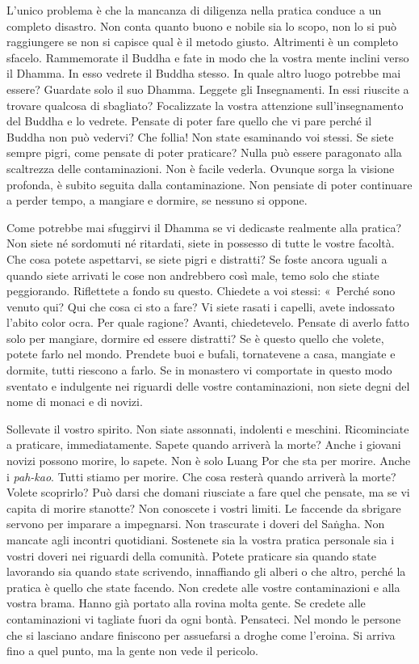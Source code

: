 L'unico problema è che la mancanza di diligenza nella pratica conduce a
un completo disastro. Non conta quanto buono e nobile sia lo scopo, non
lo si può raggiungere se non si capisce qual è il metodo giusto.
Altrimenti è un completo sfacelo. Rammemorate il Buddha e fate in modo
che la vostra mente inclini verso il Dhamma. In esso vedrete il Buddha
stesso. In quale altro luogo potrebbe mai essere? Guardate solo il suo
Dhamma. Leggete gli Insegnamenti. In essi riuscite a trovare qualcosa di
sbagliato? Focalizzate la vostra attenzione sull'insegnamento del Buddha
e lo vedrete. Pensate di poter fare quello che vi pare perché il Buddha
non può vedervi? Che follia! Non state esaminando voi stessi. Se siete
sempre pigri, come pensate di poter praticare? Nulla può essere
paragonato alla scaltrezza delle contaminazioni. Non è facile vederla.
Ovunque sorga la visione profonda, è subito seguita dalla
contaminazione. Non pensiate di poter continuare a perder tempo, a
mangiare e dormire, se nessuno si oppone.


Come potrebbe mai sfuggirvi il Dhamma se vi dedicaste realmente alla
pratica? Non siete né sordomuti né ritardati, siete in possesso di tutte
le vostre facoltà. Che cosa potete aspettarvi, se siete pigri e
distratti? Se foste ancora uguali a quando siete arrivati le cose non
andrebbero così male, temo solo che stiate peggiorando. Riflettete a
fondo su questo. Chiedete a voi stessi: «~Perché sono venuto qui? Qui
che cosa ci sto a fare? Vi siete rasati i capelli, avete indossato
l'abito color ocra. Per quale ragione? Avanti, chiedetevelo. Pensate di
averlo fatto solo per mangiare, dormire ed essere distratti? Se è questo
quello che volete, potete farlo nel mondo. Prendete buoi e bufali,
tornatevene a casa, mangiate e dormite, tutti riescono a farlo. Se in
monastero vi comportate in questo modo sventato e indulgente nei
riguardi delle vostre contaminazioni, non siete degni del nome di monaci
e di novizi.

Sollevate il vostro spirito. Non siate assonnati, indolenti e meschini.
Ricominciate a praticare, immediatamente. Sapete quando arriverà la
morte? Anche i giovani novizi possono morire, lo sapete. Non è solo
Luang Por che sta per morire. Anche i \emph{pah-kao}. Tutti stiamo per
morire. Che cosa resterà quando arriverà la morte? Volete scoprirlo? Può
darsi che domani riusciate a fare quel che pensate, ma se vi capita di
morire stanotte? Non conoscete i vostri limiti. Le faccende da sbrigare
servono per imparare a impegnarsi. Non trascurate i doveri del Saṅgha.
Non mancate agli incontri quotidiani. Sostenete sia la vostra pratica
personale sia i vostri doveri nei riguardi della comunità. Potete
praticare sia quando state lavorando sia quando state scrivendo,
innaffiando gli alberi o che altro, perché la pratica è quello che state
facendo. Non credete alle vostre contaminazioni e alla vostra brama.
Hanno già portato alla rovina molta gente. Se credete alle
contaminazioni vi tagliate fuori da ogni bontà. Pensateci. Nel mondo le
persone che si lasciano andare finiscono per assuefarsi a droghe come
l'eroina. Si arriva fino a quel punto, ma la gente non vede il pericolo.

